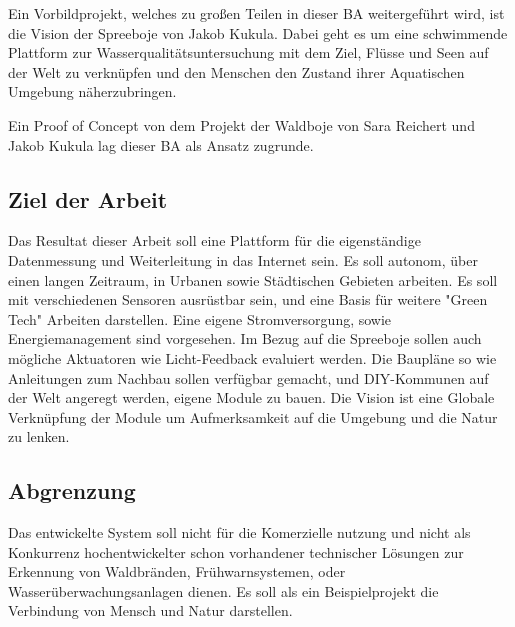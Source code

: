Ein Vorbildprojekt, welches zu großen Teilen in dieser BA weitergeführt wird, ist die Vision der Spreeboje von Jakob Kukula. Dabei geht es um eine schwimmende Plattform zur Wasserqualitätsuntersuchung mit dem Ziel, Flüsse und Seen auf der Welt zu verknüpfen und den Menschen den Zustand ihrer Aquatischen Umgebung näherzubringen.

Ein Proof of Concept von dem Projekt der Waldboje von Sara Reichert und Jakob Kukula lag dieser BA als Ansatz zugrunde.

\subsection{Ziel der Arbeit}

Das Resultat dieser Arbeit soll eine Plattform für die eigenständige Datenmessung und Weiterleitung in das Internet sein.
Es soll autonom, über einen langen Zeitraum, in Urbanen sowie Städtischen Gebieten arbeiten.
Es soll mit verschiedenen Sensoren ausrüstbar sein, und eine Basis für weitere "Green Tech" Arbeiten darstellen.
Eine eigene Stromversorgung, sowie Energiemanagement sind vorgesehen.
Im Bezug auf die Spreeboje sollen auch mögliche Aktuatoren wie Licht-Feedback evaluiert werden.
Die Baupläne so wie Anleitungen zum Nachbau sollen verfügbar gemacht, und DIY-Kommunen auf der Welt angeregt werden, eigene Module zu bauen.
Die Vision ist eine Globale Verknüpfung der Module um Aufmerksamkeit auf die Umgebung und die Natur zu lenken.







\subsection{Abgrenzung}

Das entwickelte System soll nicht für die Komerzielle nutzung und nicht als Konkurrenz hochentwickelter schon vorhandener technischer Lösungen zur Erkennung von Waldbränden, Frühwarnsystemen, oder Wasserüberwachungsanlagen dienen.
Es soll als ein Beispielprojekt die Verbindung von Mensch und Natur darstellen.

